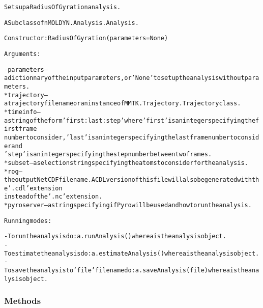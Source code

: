 \begin{alltt}
Sets up a Radius Of Gyration analysis.

A Subclass of nMOLDYN.Analysis.Analysis. 

Constructor: RadiusOfGyration({\textbar}parameters{\textbar} = None)

Arguments:

    - {\textbar}parameters{\textbar} -- a dictionnary of the input parameters, or 'None' to set up the analysis without parameters.
        * trajectory     -- a trajectory file name or an instance of MMTK.Trajectory.Trajectory class.
        * timeinfo       -- a string of the form 'first:last:step' where 'first' is an integer specifying the first frame 
                            number to consider, 'last' is an integer specifying the last frame number to consider and 
                            'step' is an integer specifying the step number between two frames.
        * subset         -- a selection string specifying the atoms to consider for the analysis.
        * rog            -- the output NetCDF file name. A CDL version of this file will also be generated with the '.cdl' extension
                            instead of the '.nc' extension.
        * pyroserver     -- a string specifying if Pyro will be used and how to run the analysis.
    
Running modes:

    - To run the analysis do: a.runAnalysis() where a is the analysis object.
    - To estimate the analysis do: a.estimateAnalysis() where a is the analysis object.
    - To save the analysis to 'file' file name do: a.saveAnalysis(file) where a is the analysis object.
\end{alltt}



  \subsubsection{Methods}

    \vspace{0.5ex}

